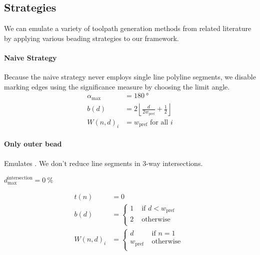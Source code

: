\subsection{Strategies}
We can emulate a variety of toolpath generation methods from related literature by applying various beading strategies to our framework.


\paragraph{Naive Strategy}
Because the naive strategy never employs single line polyline segments, we disable marking edges using the significance measure by choosing the limit angle.
\begin{align*}
\alpha_\text{max} &= \SI{180}{\degree} \\
b(d) &= 2 \left\lfloor \frac{d}{ 2w_\text{pref}} + \frac12 \right\rfloor \\
W(n,d)_i &= w_\text{pref} \text{ for all } i 
\end{align*}


\paragraph{Only outer bead}
Emulates \cite{Moesen2011}. We don't reduce line segments in 3-way intersections.

$d_\text{max}^\text{intersection} = \SI{0}{\percent}$

\begin{align*}
t(n) &= 0 \\
b(d) &=
\begin{cases}
1 & \text{ if } d < w_\text{pref} \\
2 & \text{ otherwise } \\
\end{cases}
 \\
W(n,d)_i &= 
\begin{cases}
d & \text{ if } n = 1 \\
w_\text{pref} & \text{ otherwise } \\
\end{cases}
\end{align*}


